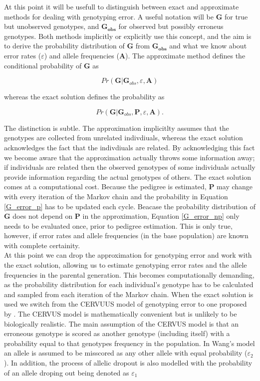 \documentclass{article}
\begin{document}
At this point it will be usefull to distinguish between exact and approximate methods for dealing with genotyping error.  A useful notation will be $\bm{G}$ for true but unobserved genotypes, and $\bm{G_{obs}}$ for observed but possibly erroneus genotypes.  Both methods implicitly or explicitly use this concept, and the aim is to derive the probability distribution of $\bm{G}$ from $\bm{G_{obs}}$ and what we know about error rates ($\varepsilon$) and allele frequencies ($\bm{A}$).  The approximate method defines the conditional probability of $\bm{G}$ as

\begin{equation}
Pr({\bm G} | {\bm G}_{obs}, {\varepsilon}, {\bm A})
\label{G_error_np}
\end{equation}

whereas the exact solution defines the probability as

\begin{equation}
Pr({\bm G} | {\bm G}_{obs}, {\bm P}, {\varepsilon}, {\bm A}).
\label{G_error_p}
\end{equation}

The distinction is subtle.  The approximation implicitlty assumes that the genotypes are collected from unrelated indivdiuals, whereas the exact solution acknowledges the fact that the indivdiuals are related.  By acknowledging this fact we become aware that the approximation actually throws some information away; if individuals are related then the observed genotypes of some individuals actually provide information regarding the actual genotypes of others. The exact solution comes at a computational cost.  Because the pedigree is estimated, ${\bm P}$ may change with every iteration of the Markov chain and the probability in Equation \ref{G_error_p} has to be updated each cycle.  Beacase the probability distribution of $\bm{G}$ does not depend on $\bm{P}$ in the approximation, Equation \ref{G_error_np} only needs to be evaluated once, prior to pedigree estimation.  This is only true, however, if error rates and allele frequencies (in the base population) are known with complete certainity.\\


 At this point we can drop the approximation for genotyping error and work with the exact solution, allowing us to estimate genotyping error rates and the allele frequencies in the parental generation. This becomes computationally demanding, as the probability distribution for each individual's genotype has to be calculated and sampled from each iteration of the Markov chain.  When the exact solution is used we switch from the CERVUUS model of genotyping error to one proposed by \citep{Wang.2004}.  The CERVUS model is mathematically convenient but is unlikely to be biologically realistic.  The main assumption of the CERVUS model is that an erroneous genotype is scored as another genotype (including itself) with a probability equal to that genotypes frequency in the population.  In Wang's model an allele is assumed to be misscored as any other allele with equal probability ($\varepsilon_{2}$).  In addition, the process of allelic dropout is also modelled with the probability of an allele droping out being denoted as $\varepsilon_{1}$
\end{document}
